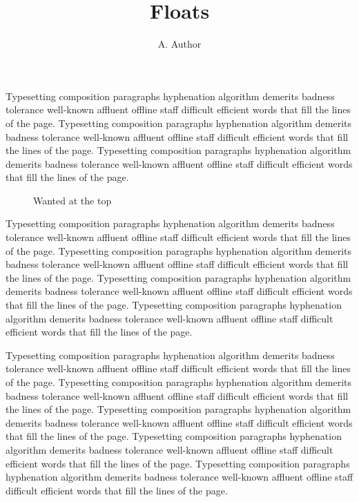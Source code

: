 \documentclass{article}
\title{Floats}
\author{A. Author}
\begin{document}
\maketitle
Typesetting composition paragraphs hyphenation algorithm demerits badness tolerance well-known affluent offline staff difficult efficient words that fill the lines of the page. Typesetting composition paragraphs hyphenation algorithm demerits badness tolerance well-known affluent offline staff difficult efficient words that fill the lines of the page. Typesetting composition paragraphs hyphenation algorithm demerits badness tolerance well-known affluent offline staff difficult efficient words that fill the lines of the page.

\begin{figure}[t]
\centering
\vspace{120pt}
\caption{Wanted at the top}
\end{figure}

Typesetting composition paragraphs hyphenation algorithm demerits badness tolerance well-known affluent offline staff difficult efficient words that fill the lines of the page. Typesetting composition paragraphs hyphenation algorithm demerits badness tolerance well-known affluent offline staff difficult efficient words that fill the lines of the page. Typesetting composition paragraphs hyphenation algorithm demerits badness tolerance well-known affluent offline staff difficult efficient words that fill the lines of the page. Typesetting composition paragraphs hyphenation algorithm demerits badness tolerance well-known affluent offline staff difficult efficient words that fill the lines of the page.

\begin{table}[b]
\centering
\vspace{60pt}
\caption{At the bottom}\label{tab:bot}
\end{table}

Typesetting composition paragraphs hyphenation algorithm demerits badness tolerance well-known affluent offline staff difficult efficient words that fill the lines of the page. Typesetting composition paragraphs hyphenation algorithm demerits badness tolerance well-known affluent offline staff difficult efficient words that fill the lines of the page. Typesetting composition paragraphs hyphenation algorithm demerits badness tolerance well-known affluent offline staff difficult efficient words that fill the lines of the page. Typesetting composition paragraphs hyphenation algorithm demerits badness tolerance well-known affluent offline staff difficult efficient words that fill the lines of the page. Typesetting composition paragraphs hyphenation algorithm demerits badness tolerance well-known affluent offline staff difficult efficient words that fill the lines of the page.
\end{document}
